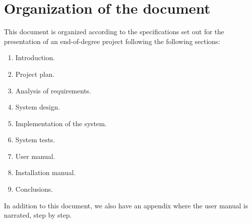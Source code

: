 \section{Organization of the document}
This document is organized according to the specifications set out for the presentation of an end-of-degree project following the following sections:
\begin{enumerate}
	\item Introduction.
	\item Project plan.
	\item Analysis of requirements.
	\item System design.
	\item Implementation of the system.
	\item System tests.
	\item User manual.
	\item Installation manual.
	\item Conclusions.
\end{enumerate}

In addition to this document, we also have an appendix where the user manual is narrated, step by step.
